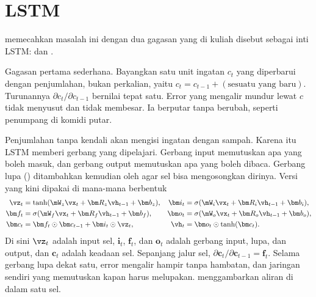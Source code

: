 \section{LSTM}

\citet{hochreiter1997} memecahkan masalah ini dengan dua gagasan yang di kuliah disebut sebagai inti
LSTM:  dan .

Gagasan pertama sederhana. Bayangkan satu unit ingatan $c_t$ yang diperbarui dengan penjumlahan,
bukan perkalian, yaitu $c_t=c_{t-1}+(\text{sesuatu yang baru})$. Turunannya
$\partial c_t/\partial c_{t-1}$ bernilai tepat satu. Error yang mengalir mundur lewat $c$ tidak
menyusut dan tidak membesar. Ia berputar tanpa berubah, seperti penumpang di komidi putar.

Penjumlahan tanpa kendali akan mengisi ingatan dengan sampah. Karena itu LSTM memberi gerbang
yang dipelajari. Gerbang input memutuskan apa yang boleh masuk, dan gerbang output memutuskan apa
yang boleh dibaca. Gerbang lupa () ditambahkan kemudian oleh \citet{gers2000}
agar sel bisa mengosongkan dirinya. Versi yang kini dipakai di mana-mana berbentuk
\begin{equation}
\begin{aligned}
\vz_t&=\tanh(\mW_z\vx_t+\bm R_z\vh_{t-1}+\bm b_z), &
\bm i_t&=\sigma(\mW_i\vx_t+\bm R_i\vh_{t-1}+\bm b_i),\\
\bm f_t&=\sigma(\mW_f\vx_t+\bm R_f\vh_{t-1}+\bm b_f), &
\bm o_t&=\sigma(\mW_o\vx_t+\bm R_o\vh_{t-1}+\bm b_o),\\
\bm c_t&=\bm f_t\odot\bm c_{t-1}+\bm i_t\odot\vz_t, &
\vh_t&=\bm o_t\odot\tanh(\bm c_t).
\end{aligned}
\end{equation}
Di sini $\vz_t$ adalah input sel, $\bm i_t$, $\bm f_t$, dan $\bm o_t$ adalah gerbang input, lupa,
dan output, dan $\bm c_t$ adalah keadaan sel. Sepanjang jalur sel, $\partial\bm c_t/\partial\bm c_{t-1}=\bm f_t$.
Selama gerbang lupa dekat satu, error mengalir hampir tanpa hambatan, dan jaringan sendiri yang
memutuskan kapan harus melupakan.  menggambarkan aliran di dalam satu sel.

